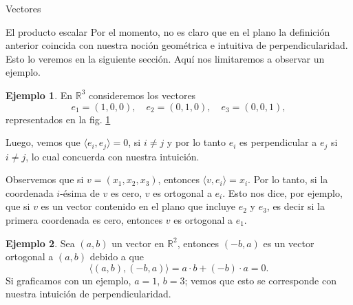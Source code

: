 \documentclass[a4paper,12pt,twoside,spanish,reqno]{amsbook}
\theoremstyle{definition}
\newtheorem{ejemplo}{Ejemplo}[section]
\theoremstyle{remark}
\newcommand{\R}{\mathbb R}
\begin{document}
\begin{chapter}{Vectores}
\begin{section}{El producto escalar}
        Por el momento, no es claro que en el plano la definición anterior coincida con nuestra noción geométrica e intuitiva de perpendicularidad. Esto lo veremos en la siguiente sección. Aquí nos limitaremos a observar un ejemplo.
        
        \begin{ejemplo}
            En  $\R^3$ consideremos los vectores
            \begin{equation*}
            e_1 = (1,0,0),\quad e_2 = (0, 1,0),\quad e_3 = (0,0,1),
            \end{equation*}
            representados en la fig. \ref{fig-canonicos-en-R3}
            \begin{figure}[h]
                \caption{}
                \label{fig-canonicos-en-R3}
            \end{figure}
            
            Luego, vemos que $\langle e_i , e_j \rangle = 0$, si $i \ne j$ y por lo tanto $e_i$  es perpendicular a $e_j$ si $i \ne j$, lo cual concuerda con nuestra intuición. 
        \end{ejemplo} 
            
            Observemos que si $v = (x_1,x_2,x_3)$,  entonces $\langle v , e_i \rangle = x_i$. Por lo tanto,  si la coordenada $i$-ésima de $v$ es cero,  $v$  es ortogonal a $e_i$. Esto nos dice,  por ejemplo,  que si $v$  es un vector contenido en el plano que incluye $e_2$ y $e_3$,  es decir si la primera coordenada es cero,  entonces $v$  es ortogonal a $e_1$. 
            
        
        \begin{ejemplo} Sea $(a,b)$ un vector en $\R^2$, entonces $(-b,a)$ es un vector ortogonal a $(a,b)$ debido a que
            \begin{equation*}
                \langle (a,b) , (-b,a) \rangle = a\cdot b + (-b) \cdot a = 0.
            \end{equation*}
            Si graficamos con un ejemplo, $a=1$, $b=3$; vemos que esto se corresponde con nuestra intuición de perpendicularidad. 
                

\end{ejemplo}
\end{section}
\end{chapter}
\end{document}
